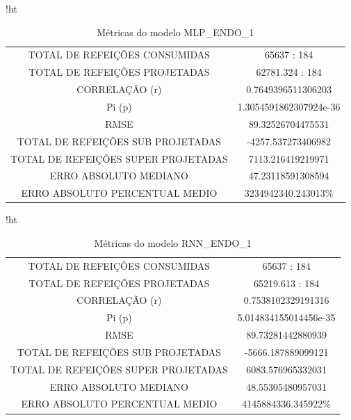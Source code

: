 \documentclass[	12pt, Times, openright, twoside, a4paper, english, brazil]{abntex2}
\begin{document}
    	    \begin{table}{!ht}
                \centering
                \caption{Métricas do modelo  MLP\_ENDO\_1 }
                    \begin{tabular}{|c|c|}
                    \rowcolor{gray!50}
                    \hline
    	   \multicolumn{2}{c}{MLP\_ENDO\_1} \\  \hline
            TOTAL DE REFEIÇÕES CONSUMIDAS & 65637 : 184 \\
            TOTAL DE REFEIÇÕES PROJETADAS & 62781.324 : 184 \\
            CORRELAÇÃO (r) & 0.7649396511306203 \\ Pi (p) & 1.3054591862307924e-36\\
            RMSE & 89.32526704475531\\
            TOTAL DE REFEIÇÕES SUB PROJETADAS &-4257.537273406982\\
            TOTAL DE REFEIÇÕES SUPER PROJETADAS & 7113.216419219971\\
            ERRO ABSOLUTO MEDIANO & 47.23118591308594\\
            ERRO ABSOLUTO PERCENTUAL MEDIO & 3234942340.243013\% \\ \hline \end{tabular}\end{table}
            
           
            \begin{table}{!ht}
                \centering
                \caption{Métricas do modelo  RNN\_ENDO\_1 }
                    \begin{tabular}{|c|c|}
                    \rowcolor{gray!50}
                    \hline
            \multicolumn{2}{c}{ RNN\_ENDO\_1} \\ \hline
            TOTAL DE REFEIÇÕES CONSUMIDAS & 65637 : 184\\
            TOTAL DE REFEIÇÕES PROJETADAS & 65219.613 : 184 \\
            CORRELAÇÃO (r) & 0.7538102329191316\\ Pi (p) & 5.014834155014456e-35\\
            RMSE & 89.73281442880939\\
            TOTAL DE REFEIÇÕES SUB PROJETADAS & -5666.187889099121\\
            TOTAL DE REFEIÇÕES SUPER PROJETADAS & 6083.576965332031\\
            ERRO ABSOLUTO MEDIANO & 48.55305480957031\\
            ERRO ABSOLUTO PERCENTUAL MEDIO &  4145884336.345922\% \\ \hline  \end{tabular}\end{table}
            
\end{document}
